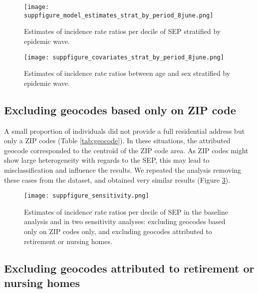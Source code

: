 \documentclass{article}
\begin{document}

	\begin{figure}[H]
	\centering
	\texttt{[image: suppfigure\_model\_estimates\_strat\_by\_period\_8june.png]}
	\caption{Estimates of incidence rate ratios per decile of SEP stratified by epidemic wave.}
	\label{fig:est_strat}
\end{figure}
	
		\begin{figure}[H]
		\centering
		\texttt{[image: suppfigure\_covariates\_strat\_by\_period\_8june.png]}
		\caption{Estimates of incidence rate ratios between age and sex stratified by epidemic wave.}
		\label{fig:cov_strat}
	\end{figure}
	
	\subsection{Excluding geocodes based only on ZIP code}

	A small proportion of individuals did not provide a full residential address but only a ZIP codes (Table \ref{tab:geocode}). 
	In these situations, the attributed geocode corresponded to the centroïd of the ZIP code area. 
	As ZIP codes might show large heterogeneity with regards to the SEP, this may lead to misclassification and influence the results.
	We repeated the analysis removing these cases from the dataset, and obtained very similar results (Figure \ref{fig:sst}).
	
	
		\begin{figure}[h]
		\centering
		\texttt{[image: suppfigure\_sensitivity.png]}
		\caption{Estimates of incidence rate ratios per decile of SEP in the baseline analysis and in two sensitivity analyses: excluding geocodes based only on ZIP codes only, and excluding geocodes attributed to retirement or nursing homes.}
		\label{fig:sst}
	\end{figure}

	\subsection{Excluding geocodes attributed to retirement or nursing homes}
	
\end{document}
